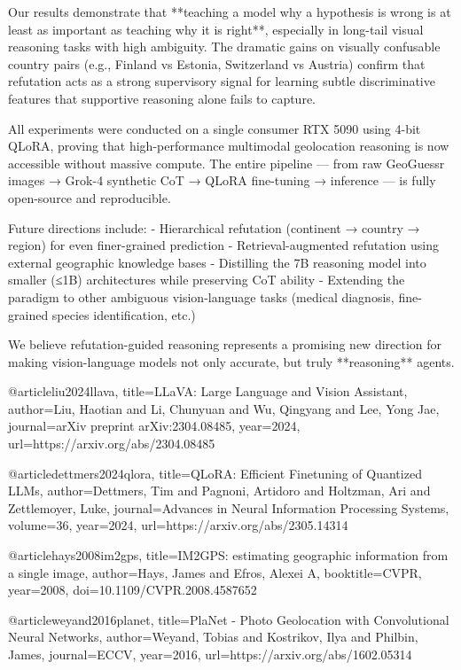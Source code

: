 \documentclass[11pt,a4paper]{article}
\begin{document}
Our results demonstrate that **teaching a model why a hypothesis is wrong is at least as important as teaching why it is right**, especially in long-tail visual reasoning tasks with high ambiguity. The dramatic gains on visually confusable country pairs (e.g., Finland vs Estonia, Switzerland vs Austria) confirm that refutation acts as a strong supervisory signal for learning subtle discriminative features that supportive reasoning alone fails to capture.

All experiments were conducted on a single consumer RTX 5090 using 4-bit QLoRA, proving that high-performance multimodal geolocation reasoning is now accessible without massive compute. The entire pipeline — from raw GeoGuessr images → Grok-4 synthetic CoT → QLoRA fine-tuning → inference — is fully open-source and reproducible.

Future directions include:
- Hierarchical refutation (continent → country → region) for even finer-grained prediction
- Retrieval-augmented refutation using external geographic knowledge bases
- Distilling the 7B reasoning model into smaller (≤1B) architectures while preserving CoT ability
- Extending the paradigm to other ambiguous vision-language tasks (medical diagnosis, fine-grained species identification, etc.)

We believe refutation-guided reasoning represents a promising new direction for making vision-language models not only accurate, but truly **reasoning** agents.




@article{liu2024llava,
  title={LLaVA: Large Language and Vision Assistant},
  author={Liu, Haotian and Li, Chunyuan and Wu, Qingyang and Lee, Yong Jae},
  journal={arXiv preprint arXiv:2304.08485},
  year={2024},
  url={https://arxiv.org/abs/2304.08485}
}

@article{dettmers2024qlora,
  title={{QLoRA}: Efficient Finetuning of Quantized LLMs},
  author={Dettmers, Tim and Pagnoni, Artidoro and Holtzman, Ari and Zettlemoyer, Luke},
  journal={Advances in Neural Information Processing Systems},
  volume={36},
  year={2024},
  url={https://arxiv.org/abs/2305.14314}
}

@article{hays2008im2gps,
  title={IM2GPS: estimating geographic information from a single image},
  author={Hays, James and Efros, Alexei A},
  booktitle={CVPR},
  year={2008},
  doi={10.1109/CVPR.2008.4587652}
}

@article{weyand2016planet,
  title={PlaNet - Photo Geolocation with Convolutional Neural Networks},
  author={Weyand, Tobias and Kostrikov, Ilya and Philbin, James},
  journal={ECCV},
  year={2016},
  url={https://arxiv.org/abs/1602.05314}
}
\end{document}

